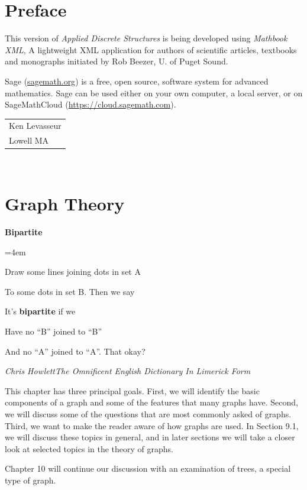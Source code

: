 \documentclass[10pt,]{book}
\newcommand{\terminology}[1]{\textbf{#1}}
\theoremstyle{plain}
\theoremstyle{definition}
\theoremstyle{definition}
\theoremstyle{definition}
\theoremstyle{definition}
\theoremstyle{definition}
\numberwithin{equation}{section}
\newenvironment{poem}{\setlength{\parindent}{0em}}{}
\newcommand{\poemTitle}[1]{\begin{center}\large\textbf{#1}\end{center}}
\newenvironment{stanza}{\vspace{0.25 em}\hangindent=4em}{\vspace{1 em}}
\newcommand{\poemauthorleft}[1]{\vspace{-1em}\begin{flushleft}\textit{#1}\end{flushleft}}
\newcommand{\poemlineleft}[1]{{\raggedright{#1}\par}\vspace{-\parskip}}
\begin{document}
\chapter*{Preface}\label{preface-1}
This version of \emph{Applied Discrete Structures} is being developed using \emph{Mathbook XML}, A lightweight XML application for authors of scientific articles, textbooks and monographs initiated by Rob Beezer, U. of Puget Sound.  %
\par
Sage (\href{http://sagemath.org}{sagemath.org}) is a free, open source, software system for advanced mathematics.  Sage can be used either on your own computer, a local server, or on SageMathCloud (\href{https://cloud.sagemath.com}{https://cloud.sagemath.com}). %
\par\hfill\begin{tabular}{l@{}}
Ken Levasseur\\
Lowell MA
\end{tabular}\\\par
\setcounter{tocdepth}{1}
\renewcommand*\contentsname{Contents}
\tableofcontents
\mainmatter
\typeout{************************************************}
\typeout{************************************************}
\chapter[Graph Theory]{Graph Theory}\label{chapter_9}
\typeout{************************************************}
\typeout{************************************************}
\begin{poem}
\poemTitle{Bipartite}
\begin{stanza}
\poemlineleft{Draw some lines joining dots in set A}
\poemlineleft{To some dots in set B. Then we say}
\poemlineleft{It's \terminology{bipartite} if we}
\poemlineleft{Have no ``B'' joined to ``B''}
\poemlineleft{And no ``A'' joined to ``A''. That okay?}
\end{stanza}
\poemauthorleft{Chris HowlettThe Omnificent English Dictionary In Limerick Form}
\end{poem}
This chapter has three principal goals. First, we will identify the basic components of a graph and some of the features that many graphs have. Second, we will discuss some of the questions that are most commonly asked of graphs. Third, we want to make the reader aware of how graphs
are used. In Section 9.1, we will discuss these topics in general, and in later sections we will take a closer look
at selected topics in the theory of graphs.%
\par
Chapter 10 will continue our discussion with an examination of trees, a special type of graph.
%
\typeout{************************************************}
\typeout{************************************************}
\end{document}
